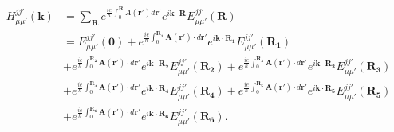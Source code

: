 \documentclass{report}
\begin{document}
\begin{equation}
	\begin{aligned}
		H_{\mu\mu'}^{jj'}(\mathbf{k})
		 & = \sum_{\mathbf{R}} e^{\frac{ie}{\hbar}\int_{0}^{\mathbf{R}}A(\mathbf{r'})d\mathbf{r'}}e^{i\mathbf{k\cdot R}} E_{\mu\mu'}^{jj'}(\mathbf{R})                                                                                                                                                   \\
		 & = E_{\mu\mu'}^{jj'}(\mathbf{0}) + e^{\frac{ie}{\hbar}\int_{0}^{\mathbf{R_1}}\mathbf{A(\mathbf{r'})}\cdot d\mathbf{r'}}e^{i\mathbf{k\cdot R_1}} E_{\mu\mu'}^{jj'}(\mathbf{R_1})                                                                                                                \\
		 & + e^{\frac{ie}{\hbar}\int_{0}^{\mathbf{R_2}}\mathbf{A(\mathbf{r'})}\cdot d\mathbf{r'}}e^{i\mathbf{k\cdot R_2}} E_{\mu\mu'}^{jj'}(\mathbf{R_2}) + e^{\frac{ie}{\hbar}\int_{0}^{\mathbf{R_3}}\mathbf{A(\mathbf{r'})}\cdot d\mathbf{r'}}e^{i\mathbf{k\cdot R_3}} E_{\mu\mu'}^{jj'}(\mathbf{R_3}) \\
		 & + e^{\frac{ie}{\hbar}\int_{0}^{\mathbf{R_4}}\mathbf{A(\mathbf{r'})}\cdot d\mathbf{r'}}e^{i\mathbf{k\cdot R_4}} E_{\mu\mu'}^{jj'}(\mathbf{R_4}) + e^{\frac{ie}{\hbar}\int_{0}^{\mathbf{R_5}}\mathbf{A(\mathbf{r'})}\cdot d\mathbf{r'}}e^{i\mathbf{k\cdot R_5}} E_{\mu\mu'}^{jj'}(\mathbf{R_5}) \\
		 & + e^{\frac{ie}{\hbar}\int_{0}^{\mathbf{R_6}}\mathbf{A(\mathbf{r'})}\cdot d\mathbf{r'}}e^{i\mathbf{k\cdot R_6}} E_{\mu\mu'}^{jj'}(\mathbf{R_6}).
	\end{aligned}
\end{equation}
\end{document}
